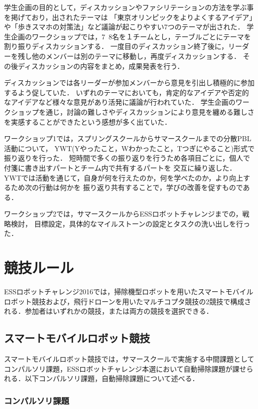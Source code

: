 \documentclass[submit]{ipsj}
\begin{document}
学生企画の目的として，ディスカッションやファシリテーションの方法を学ぶ事を掲げており，出されたテーマは
「東京オリンピックをよりよくするアイデア」や「歩きスマホの対策法」など議論が起こりやすい7つのテーマが出された．
学生企画のワークショップでは，7~8名を１チームとし，テーブルごとにテーマを割り振りディスカッションする．
一度目のディスカッション終了後に，リーダーを残し他のメンバーは別のテーマに移動し，再度ディスカッションする．
その後ディスカッションの内容をまとめ，成果発表を行う．

ディスカッションでは各リーダーが参加メンバーから意見を引出し積極的に参加するよう促していた．
いずれのテーマにおいても，肯定的なアイデアや否定的なアイデアなど様々な意見があり活発に議論が行われていた．
学生企画のワークショップを通じ，討論の難しさやディスカッションにより意見を纏める難しさを実感することができたという感想が多く出ていた．

ワークショップ1では，スプリングスクールからサマースクールまでの分散PBL活動について，
YWT(Yやったこと，Wわかったこと，Tつぎにやること)形式で振り返りを行った．
短時間で多くの振り返りを行うため各項目ごとに，個人で付箋に書き出すパートとチーム内で共有するパートを
交互に繰り返した．
YWTでは活動を通じて，自身が何を行えたのか，何を学べたのか，より向上するため次の行動は何かを
振り返り共有することで，学びの改善を促すものである．

ワークショップ2では，サマースクールからESSロボットチャレンジまでの，戦略検討，
目標設定，具体的なマイルストーンの設定とタスクの洗い出しを行った．
\section{競技ルール}

ESSロボットチャレンジ2016では，掃除機型ロボットを用いたスマートモバイルロボット競技および，飛行ドローンを用いたマルチコプタ競技の2競技で構成される．参加者はいずれかの競技，または両方の競技を選択できる．

\subsection{スマートモバイルロボット競技}
スマートモバイルロボット競技では，サマースクールで実施する中間課題としてコンパルソリ課題，ESSロボットチャレンジ本選において自動掃除課題が課せられる．以下コンパルソリ課題，自動掃除課題について述べる．

\subsubsection{コンパルソリ課題}
\end{document}
